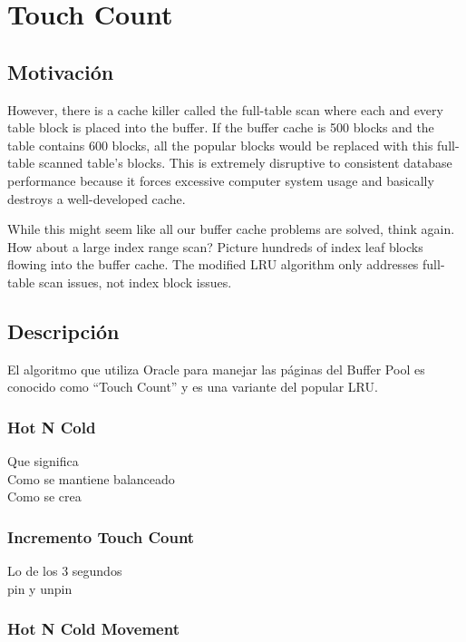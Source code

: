 \section{Touch Count}

\subsection{Motivación}

However, there is a cache killer called the full-table scan where each and every table block is
placed into the buffer. If the buffer cache is 500 blocks and the table contains 600 blocks, all the
popular blocks would be replaced with this full-table scanned table’s blocks. This is extremely
disruptive to consistent database performance because it forces excessive computer system usage
and basically destroys a well-developed cache.


While this might seem like all our buffer cache problems are solved, think again. How about a
large index range scan? Picture hundreds of index leaf blocks flowing into the buffer cache. The
modified LRU algorithm only addresses full-table scan issues, not index block issues.


\subsection{Descripción}
El algoritmo que utiliza Oracle para manejar las páginas del Buffer Pool es conocido
como “Touch Count” y es una variante del popular LRU.

\subsubsection{Hot N Cold}

Que significa\\
Como se mantiene balanceado \\
Como se crea\\

\subsubsection{Incremento Touch Count}

Lo de los 3 segundos\\
pin y unpin\\

\subsubsection{Hot N Cold Movement}

